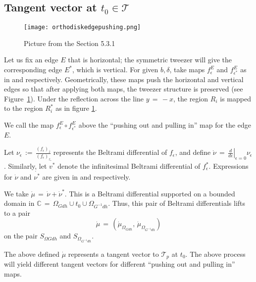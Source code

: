 \documentclass[12pt,epsfig,tikz,multi]{amsart}
\numberwithin{equation}{section}
\begin{document}
\subsection {Tangent vector at $t_0\in \mathcal{T}$}

\begin{figure}
    \centering
   \texttt{[image: orthodiskedgepushing.png]}
    \caption{Picture from the Section 5.3.1 \cite{Weber1998TeichmullerTA}}
    \label{fig:FepsilonandFepsilon*}
\end{figure}
Let us fix an edge $E$ that is horizontal; the symmetric tweezer will give the corresponding edge $E^*$, which is vertical. 
For given $b, \delta$, take maps $f_\epsilon^E$ and $f_{\epsilon^*}^E$ as in \cite[(5.1)(a)]{Weber1998TeichmullerTA} and
\cite[(5.1)(b)]{Weber1998TeichmullerTA} respectively.
Geometrically, these maps push the horizontal and vertical edges so that after applying both maps, the tweezer structure
is preserved (see Figure~\ref{fig:FepsilonandFepsilon*}).  Under the reflection across the line $y\,=\,-x$, the region $R_i$ is
mapped to the region $R_i^*$ as in figure \ref{fig:FepsilonandFepsilon*}.

We call the map $f^E_\epsilon \circ f^{E}_{\epsilon^*}$ above the ``pushing out and pulling in''  map for the edge $E$.



Let $\nu_\epsilon \,:=\, \frac{(f_\epsilon)_{\overline{z}}}{(f_\epsilon)_{z}}$ represents the Beltrami differential of $f_\epsilon$, and 
define $\dot{\nu} \,= \,\left. \frac{d}{d\epsilon}\right|_{\epsilon=0}\nu_\epsilon$. Similarly, let $\dot{v^{*}}$ denote the infinitesimal 
Beltrami differential of $f^*_\epsilon$. Expressions for $\dot{\nu}$ and $\dot{\nu^{*}}$ are given in
\cite[(5.1)(a)]{Weber1998TeichmullerTA} and \cite[(5.1)(b)]{Weber1998TeichmullerTA} respectively.

We take $\dot{\mu} \,= \,\dot{\nu} + \dot{\nu}^*$. This is a Beltrami differential supported on a bounded domain in
$\mathbb{C}\,=\, \Omega_{Gdh}\cup t_0\cup\Omega_{G^{-1}dh}$. Thus, this pair of Beltrami differentials lifts to a pair 
\begin{equation}\label{tangentvector}
    \dot{\mu}\,=\,(\dot{\mu}_{\Omega_{Gdh}},\, \dot{\mu}_{\Omega_{G^{-1}dh}})
\end{equation}
on the pair $S_{\Omega{Gdh}}$ and $S_{\Omega_{G^{-1}dh}}$. 

The above defined $\dot{\mu}$ represents a tangent vector to $\mathcal{T}_p$ at $t_0$.  The above process will yield different tangent vectors for different ``pushing out and pulling in'' maps. 
\end{document}
